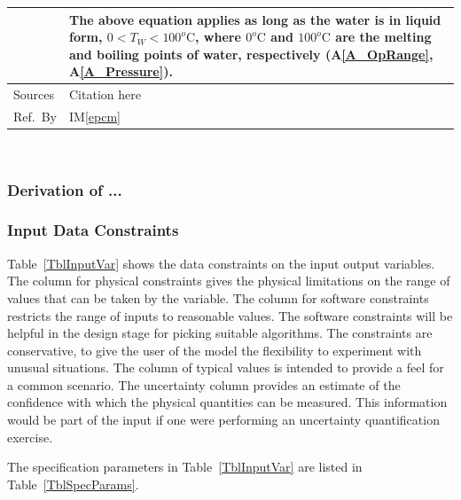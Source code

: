\documentclass[12pt]{article}
\newcommand{\colAwidth}{0.13\textwidth}
\newcommand{\colBwidth}{0.82\textwidth}
\newcommand{\aref}[1]{A\ref{#1}}
\newcommand{\iref}[1]{IM\ref{#1}}
\begin{document}
\begin{minipage}{\textwidth}
\begin{tabular}{| p{\colAwidth} | p{\colBwidth}|}
                    & The above equation applies as long as the water is in liquid form,
        $0<T_W<100^o\text{C}$, where $0^o\text{C}$ and $100^o\text{C}$ are the melting
        and boiling points of water, respectively (\aref{A_OpRange}, \aref{A_Pressure}).
        \\
        \hline
        Sources     & Citation here                                                                       \\
        \hline
        Ref.\ By    & \iref{epcm}                                                                         \\
        \hline
    \end{tabular}
\end{minipage}\\


\subsubsection*{Derivation of ...}


\subsubsection{Input Data Constraints} \label{sec_DataConstraints}

Table~\ref{TblInputVar} shows the data constraints on the input output
variables.  The column for physical constraints gives the physical limitations
on the range of values that can be taken by the variable.  The column for
software constraints restricts the range of inputs to reasonable values.  The
software constraints will be helpful in the design stage for picking suitable
algorithms.  The constraints are conservative, to give the user of the model the
flexibility to experiment with unusual situations.  The column of typical values
is intended to provide a feel for a common scenario.  The uncertainty column
provides an estimate of the confidence with which the physical quantities can be
measured.  This information would be part of the input if one were performing an
uncertainty quantification exercise.

The specification parameters in Table~\ref{TblInputVar} are listed in
Table~\ref{TblSpecParams}.
\end{document}
